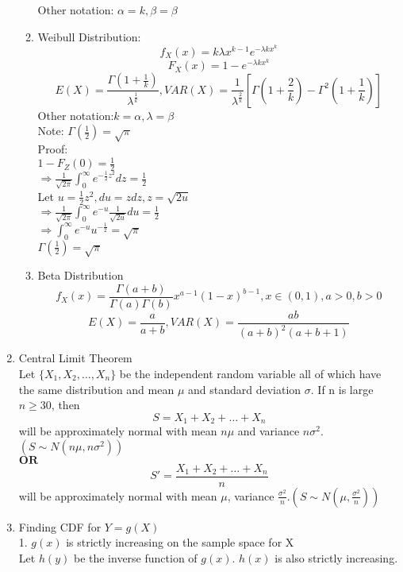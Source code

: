 \documentclass[10pt]{article}
\begin{document}
\begin{multicols}{2}
\begin{enumerate}
\begin{enumerate}
				Other notation: $\alpha = k, \beta = \beta$
				\item Weibull Distribution:\\
				$$f_X(x) = k\lambda x^{k-1}e^{-\lambda kx^k}$$
				$$F_X(x) = 1 - e^{-\lambda kx^k}$$
				$$E(X) = \frac{\Gamma(1+\frac{1}{k})}{\lambda^{\frac{1}{k}}}, VAR(X) = \frac{1}{\lambda^{\frac{2}{k}}}[\Gamma(1+\frac{2}{k}) - \Gamma^2(1+\frac{1}{k})]$$
				Other notation:$k = \alpha, \lambda = \beta$\\
				Note: $\Gamma(\frac{1}{2}) = \sqrt{\pi}$\\
				Proof:\\
				$1 - F_Z(0) = \frac{1}{2}$\\
				$\Rightarrow \frac{1}{\sqrt{2\pi}}\int_{0}^{\infty}e^{-\frac{1}{2}z^2}dz = \frac{1}{2}$\\
				Let $u = \frac{1}{2}z^2, du = zdz, z = \sqrt{2u}$\\
				$\Rightarrow \frac{1}{\sqrt{2\pi}}\int_{0}^{\infty}e^{-u}\frac{1}{\sqrt{2u}}du = \frac{1}{2}$\\
				$\Rightarrow \int_{0}^{\infty}e^{-u}u^{-\frac{1}{2}} = \sqrt{\pi}$\\
				$\Gamma(\frac{1}{2}) = \sqrt{\pi}$
				\item Beta Distribution
				$$f_X(x) = \frac{\Gamma(a + b)}{\Gamma(a)\Gamma(b)}x^{a-1}(1-x)^{b-1}, x \in (0,1), a>0, b>0$$
				$$E(X) = \frac{a}{a+b}, VAR(X) = \frac{ab}{(a+b)^2(a+b+1)}$$
			\end{enumerate}
			\item Central Limit Theorem\\
			Let $\{ X_1, X_2, \dots, X_n \}$ be the independent random variable all of which have the same distribution and mean $\mu$ and standard deviation $\sigma$. If n is large $n \ge 30$, then 
			$$ S = X_1 + X_2 + \dots + X_n$$
			will be approximately normal with mean $n\mu$ and variance $n\sigma^2$. $(S\sim N(n\mu, n\sigma^2))$\\
			$\textbf{OR}$\\
			$$S' = \frac{X_1 + X_2 + \dots + X_n}{n}$$
			will be approximately normal with mean $\mu$, variance $\frac{\sigma^2}{n}$.$(S\sim N(\mu, \frac{\sigma^2}{n}))$\\
			\item Finding CDF for $Y = g(X)$\\
			1. $g(x)$ is strictly increasing on the sample space for X\\
			Let $h(y)$ be the inverse function of $g(x)$. $h(x)$ is also strictly increasing.
			\begin{align*}

\end{align*}
\end{enumerate}
\end{multicols}
\end{document}
